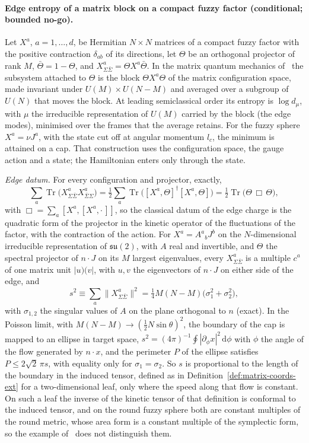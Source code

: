 \paragraph{Edge entropy of a matrix block on a compact fuzzy factor (conditional; bounded no-go).}
Let \(X^a\), \(a=1,\dots,d\), be Hermitian \(N\times N\) matrices of a compact fuzzy factor with the positive contraction \(\delta_{ab}\) of its directions, let \(\Theta\) be an orthogonal projector of rank \(M\), \(\bar\Theta=1-\Theta\), and \(X^a_{\Sigma\bar\Sigma}=\Theta X^a\bar\Theta\). In the matrix quantum mechanics of~\cite{FlissFrenkelHartnollSoni2025} the subsystem attached to \(\Theta\) is the block \(\Theta X^a\Theta\) of the matrix configuration space, made invariant under \(U(M)\times U(N-M)\) and averaged over a subgroup of \(U(N)\) that moves the block. At leading semiclassical order its entropy is \(\log d_\mu\), with \(\mu\) the irreducible representation of \(U(M)\) carried by the block (the edge modes), minimised over the frames that the average retains. For the fuzzy sphere \(X^a=\nu J^a\), with the state cut off at angular momentum \(l_c\), the minimum is attained on a cap. That construction uses the configuration space, the gauge action and a state; the Hamiltonian enters only through the state.

\emph{Edge datum.} For every configuration and projector, exactly,
\[
\sum_a\operatorname{Tr}\bigl(X^a_{\Sigma\bar\Sigma}X^a_{\bar\Sigma\Sigma}\bigr)
=\tfrac12\sum_a\operatorname{Tr}\bigl([X^a,\Theta]^\dagger[X^a,\Theta]\bigr)
=\tfrac12\operatorname{Tr}\bigl(\Theta\,\Box\,\Theta\bigr),
\]
with \(\Box=\sum_a[X^a,[X^a,\cdot\,]]\), so the classical datum of the edge charge is the quadratic form of the projector in the kinetic operator of the fluctuations of the factor, with the contraction of the action. For \(X^a=A^a{}_bJ^b\) on the \(N\)-dimensional irreducible representation of \(\mathfrak{su}(2)\), with \(A\) real and invertible, and \(\Theta\) the spectral projector of \(n\cdot J\) on its \(M\) largest eigenvalues, every \(X^a_{\Sigma\bar\Sigma}\) is a multiple \(c^a\) of one matrix unit \(|u)(v|\), with \(u,v\) the eigenvectors of \(n\cdot J\) on either side of the edge, and
\[
s^2\equiv\sum_a\bigl\|X^a_{\Sigma\bar\Sigma}\bigr\|^2=\tfrac14M(N-M)\bigl(\sigma_1^2+\sigma_2^2\bigr),
\]
with \(\sigma_{1,2}\) the singular values of \(A\) on the plane orthogonal to \(n\) (exact). In the Poisson limit, with \(M(N-M)\to(\tfrac12N\sin\theta)^2\), the boundary of the cap is mapped to an ellipse in target space, \(s^2=(4\pi)^{-1}\oint|\partial_\phi x|^2\,\mathrm d\phi\) with \(\phi\) the angle of the flow generated by \(n\cdot x\), and the perimeter \(P\) of the ellipse satisfies \(P\le2\sqrt2\,\pi s\), with equality only for \(\sigma_1=\sigma_2\). So \(s\) is proportional to the length of the boundary in the induced tensor, defined as in Definition~\ref{def:matrix-coords-ext} for a two-dimensional leaf, only where the speed along that flow is constant. On such a leaf the inverse of the kinetic tensor of that definition is conformal to the induced tensor, and on the round fuzzy sphere both are constant multiples of the round metric, whose area form is a constant multiple of the symplectic form, so the example of~\cite{FlissFrenkelHartnollSoni2025} does not distinguish them.

